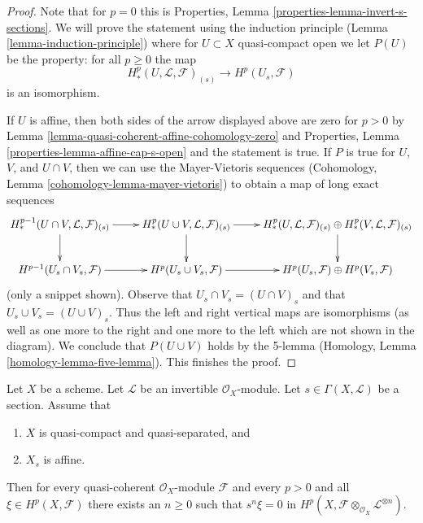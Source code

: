 \begin{proof}
Note that for $p = 0$ this is
Properties, Lemma \ref{properties-lemma-invert-s-sections}.
We will prove the statement using the induction
principle (Lemma \ref{lemma-induction-principle}) where for
$U \subset X$ quasi-compact open we let $P(U)$ be the property:
for all $p \geq 0$ the map
$$
H^p_*(U, \mathcal{L}, \mathcal{F})_{(s)}
\longrightarrow
H^p(U_s, \mathcal{F})
$$
is an isomorphism.

\medskip\noindent
If $U$ is affine, then both sides of the arrow displayed above
are zero for $p > 0$ by
Lemma \ref{lemma-quasi-coherent-affine-cohomology-zero}
and
Properties, Lemma \ref{properties-lemma-affine-cap-s-open}
and the statement is true. If $P$ is true for $U$, $V$, and $U \cap V$,
then we can use the Mayer-Vietoris sequences
(Cohomology, Lemma \ref{cohomology-lemma-mayer-vietoris}) to obtain
a map of long exact sequences
$$
\xymatrix{
H^{p - 1}_*(U \cap V, \mathcal{L}, \mathcal{F})_{(s)} \ar[r] \ar[d] &
H^p_*(U \cup V, \mathcal{L}, \mathcal{F})_{(s)} \ar[r] \ar[d] &
H^p_*(U, \mathcal{L}, \mathcal{F})_{(s)}
\oplus
H^p_*(V, \mathcal{L}, \mathcal{F})_{(s)} \ar[d] \\
H^{p - 1}(U_s \cap V_s, \mathcal{F}) \ar[r]&
H^p(U_s \cup V_s, \mathcal{F}) \ar[r] &
H^p(U_s, \mathcal{F})
\oplus
H^p(V_s, \mathcal{F})
}
$$
(only a snippet shown). Observe that $U_s \cap V_s = (U \cap V)_s$ and
that $U_s \cup V_s = (U \cup V)_s$. Thus the left and right vertical
maps are isomorphisms (as well as one more to the right and one more
to the left which are not shown in the diagram).
We conclude that $P(U \cup V)$ holds by
the 5-lemma (Homology, Lemma \ref{homology-lemma-five-lemma}).
This finishes the proof.
\end{proof}

\begin{lemma}
\label{lemma-section-affine-open-kills-classes}
Let $X$ be a scheme.
Let $\mathcal{L}$ be an invertible $\mathcal{O}_X$-module.
Let $s \in \Gamma(X, \mathcal{L})$ be a section.
Assume that
\begin{enumerate}
\item $X$ is quasi-compact and quasi-separated, and
\item $X_s$ is affine.
\end{enumerate}
Then for every quasi-coherent $\mathcal{O}_X$-module $\mathcal{F}$ and
every $p > 0$ and all $\xi \in H^p(X, \mathcal{F})$ there exists
an $n \geq 0$ such that $s^n\xi = 0$ in
$H^p(X, \mathcal{F} \otimes_{\mathcal{O}_X} \mathcal{L}^{\otimes n})$.
\end{lemma}

